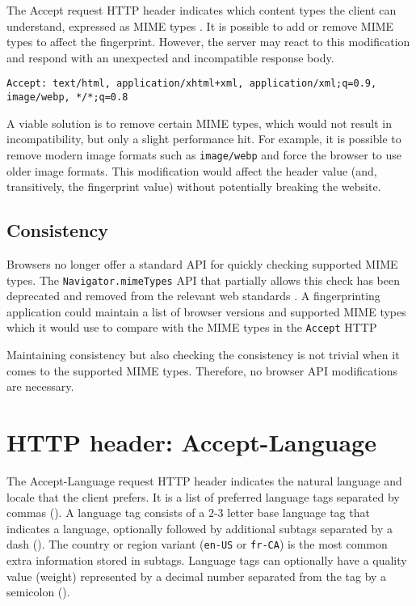 The Accept request HTTP header indicates which content types the client can understand, expressed as MIME types \cite{MDNHeaderAccept}. It is possible to add or remove MIME types to affect the fingerprint. However, the server may react to this modification and respond with an unexpected and incompatible response body.

\bigbreak

\begin{lstlisting}[caption={An example of Accept header contents \cite{MDNHeaderAccept}.}]
Accept: text/html, application/xhtml+xml, application/xml;q=0.9, image/webp, */*;q=0.8
\end{lstlisting}

\medbreak

A viable solution is to remove certain MIME types, which would not result in incompatibility, but only a slight performance hit. For example, it is possible to remove modern image formats such as \texttt{image/webp} and force the browser to use older image formats. This modification would affect the header value (and, transitively, the fingerprint value) without potentially breaking the website.

\subsection{Consistency}

Browsers no longer offer a standard API for quickly checking supported MIME types. The \texttt{Navigator.mimeTypes} API that partially allows this check has been deprecated and removed from the relevant web standards \cite{MDNNavigatorInterface}. A fingerprinting application could maintain a list of browser versions and supported MIME types which it would use to compare with the MIME types in the \texttt{Accept} HTTP 

Maintaining consistency but also checking the consistency is not trivial when it comes to the supported MIME types. Therefore, no browser API modifications are necessary.

\section{HTTP header: Accept-Language}
\label{SectionHTTPHeaderAcceptLanguage}

The Accept-Language request HTTP header \cite{MDNHeaderAcceptLanguage} indicates the natural language and locale that the client prefers. It is a list of preferred language tags separated by commas (\uv{,}). A language tag consists of a 2-3 letter base language tag that indicates a language, optionally followed by additional subtags separated by a dash (\uv{-}). The country or region variant (\texttt{en-US} or \texttt{fr-CA}) is the most common extra information stored in subtags. Language tags can optionally have a quality value (weight) represented by a decimal number separated from the tag by a semicolon (\uv{;}).


